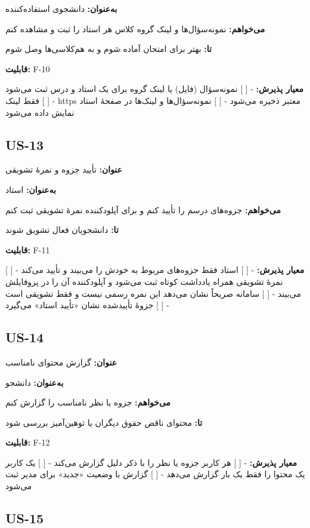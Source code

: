 \documentclass[12pt, a4paper]{article}
\begin{document}
\textbf{به‌عنوان:} دانشجوی استفاده‌کننده

\textbf{می‌خواهم:} نمونه‌سؤال‌ها و لینک گروه کلاس هر استاد را ثبت و مشاهده کنم

\textbf{تا:} بهتر برای امتحان آماده شوم و به هم‌کلاسی‌ها وصل شوم

\textbf{قابلیت:} F-10

\textbf{معیار پذیرش:}
- {[} {]} نمونه‌سؤال (فایل) یا لینک گروه برای یک استاد و درس ثبت می‌شود
- {[} {]} فقط لینک https معتبر ذخیره می‌شود
- {[} {]} نمونه‌سؤال‌ها و لینک‌ها در صفحهٔ استاد نمایش داده می‌شود

\subsection{US-13}

\textbf{عنوان:} تأیید جزوه و نمرهٔ تشویقی

\textbf{به‌عنوان:} استاد

\textbf{می‌خواهم:} جزوه‌های درسم را تأیید کنم و برای آپلودکننده نمرهٔ تشویقی ثبت کنم

\textbf{تا:} دانشجویان فعال تشویق شوند

\textbf{قابلیت:} F-11

\textbf{معیار پذیرش:}
- {[} {]} استاد فقط جزوه‌های مربوط به خودش را می‌بیند و تأیید می‌کند
- {[} {]} نمرهٔ تشویقی همراه یادداشت کوتاه ثبت می‌شود و آپلودکننده آن را در پروفایلش می‌بیند
- {[} {]} سامانه صریحاً نشان می‌دهد این نمره رسمی نیست و فقط تشویقی است
- {[} {]} جزوهٔ تأییدشده نشان «تأیید استاد» می‌گیرد

\subsection{US-14}

\textbf{عنوان:} گزارش محتوای نامناسب

\textbf{به‌عنوان:} دانشجو

\textbf{می‌خواهم:} جزوه یا نظر نامناسب را گزارش کنم

\textbf{تا:} محتوای ناقض حقوق دیگران یا توهین‌آمیز بررسی شود

\textbf{قابلیت:} F-12

\textbf{معیار پذیرش:}
- {[} {]} هر کاربر جزوه یا نظر را با ذکر دلیل گزارش می‌کند
- {[} {]} یک کاربر یک محتوا را فقط یک بار گزارش می‌دهد
- {[} {]} گزارش با وضعیت «جدید» برای مدیر ثبت می‌شود

\subsection{US-15}
\end{document}
